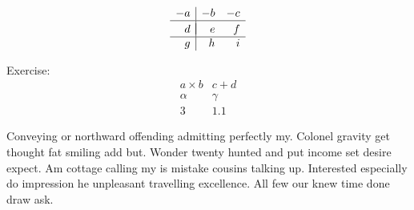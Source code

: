 \documentclass[letterpaper, notitlepage, 12pt]{article}
\begin{document}
\[
\begin{array}{r|rr} 
-a & -b & -c \\
\hline \\ [-1em]
d & e & f \\
\hline
g & h & i
\end{array}
\]

Exercise:
\[
\begin{array}{||r|l||} 
a\times b & c+d \\
\alpha & \gamma \\
\hline
3 & 1.1
\end{array}
\]

Conveying or northward offending admitting perfectly my. Colonel gravity get thought fat smiling add but. Wonder twenty hunted and put income set desire expect. Am cottage calling my is mistake cousins talking up. Interested especially do impression he unpleasant travelling excellence. All few our knew time done draw ask.  
\end{document}
